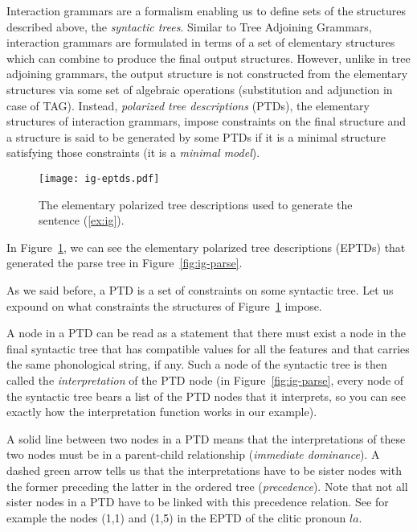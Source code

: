 Interaction grammars are a formalism enabling us to define sets of the
structures described above, the \emph{syntactic trees}. Similar to Tree
Adjoining Grammars, interaction grammars are formulated in terms of a
set of elementary structures which can combine to produce the final
output structures. However, unlike in tree adjoining grammars, the
output structure is not constructed from the elementary structures via
some set of algebraic operations (substitution and adjunction in case of
TAG). Instead, \emph{polarized tree descriptions} (PTDs), the elementary
structures of interaction grammars, impose constraints on the final
structure and a structure is said to be generated by some PTDs if it is
a minimal structure satisfying those constraints (it is a \emph{minimal
  model}).

\begin{figure}
  \centering
  \texttt{[image: ig-eptds.pdf]}
  \caption{\label{fig:ig-eptds} The elementary polarized tree
    descriptions used to generate the sentence (\ref{ex:ig}).}
\end{figure}

In Figure~\ref{fig:ig-eptds}, we can see the elementary polarized tree
descriptions (EPTDs) that generated the parse tree in
Figure~\ref{fig:ig-parse}.

As we said before, a PTD is a set of constraints on some syntactic
tree. Let us expound on what constraints the structures of
Figure~\ref{fig:ig-eptds} impose.

A node in a PTD can be read as a statement that there must exist a node
in the final syntactic tree that has compatible values for all the
features and that carries the same phonological string, if any. Such a
node of the syntactic tree is then called the \emph{interpretation} of
the PTD node (in Figure~\ref{fig:ig-parse}, every node of the syntactic
tree bears a list of the PTD nodes that it interprets, so you can see
exactly how the interpretation function works in our example).

A solid line between two nodes in a PTD means that the interpretations
of these two nodes must be in a parent-child relationship
(\emph{immediate dominance}). A dashed green arrow tells us that the
interpretations have to be sister nodes with the former preceding the
latter in the ordered tree (\emph{precedence}). Note that not all sister
nodes in a PTD have to be linked with this precedence relation. See for
example the nodes (1,1) and (1,5) in the EPTD of the clitic pronoun
$la$.

